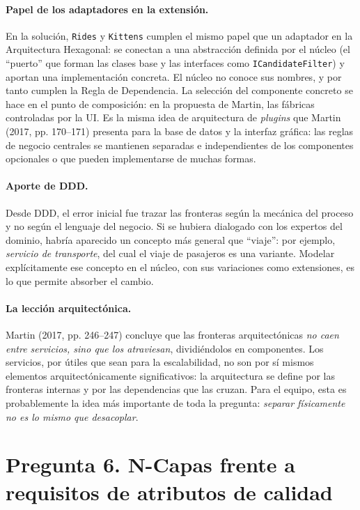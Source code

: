 \documentclass[11pt,a4paper]{article}
\begin{document}
\paragraph{Papel de los adaptadores en la extensión.} En la solución, \texttt{Rides} y \texttt{Kittens} cumplen el mismo papel que un adaptador en la Arquitectura Hexagonal: se conectan a una abstracción definida por el núcleo (el ``puerto'' que forman las clases base y las interfaces como \texttt{ICandidateFilter}) y aportan una implementación concreta. El núcleo no conoce sus nombres, y por tanto cumplen la Regla de Dependencia. La selección del componente concreto se hace en el punto de composición: en la propuesta de Martin, las fábricas controladas por la UI. Es la misma idea de arquitectura de \emph{plugins} que Martin (2017, pp. 170--171) presenta para la base de datos y la interfaz gráfica: las reglas de negocio centrales se mantienen separadas e independientes de los componentes opcionales o que pueden implementarse de muchas formas.

\paragraph{Aporte de DDD.} Desde DDD, el error inicial fue trazar las fronteras según la mecánica del proceso y no según el lenguaje del negocio. Si se hubiera dialogado con los expertos del dominio, habría aparecido un concepto más general que ``viaje'': por ejemplo, \emph{servicio de transporte}, del cual el viaje de pasajeros es una variante. Modelar explícitamente ese concepto en el núcleo, con sus variaciones como extensiones, es lo que permite absorber el cambio.

\paragraph{La lección arquitectónica.} Martin (2017, pp. 246--247) concluye que las fronteras arquitectónicas \emph{no caen entre servicios, sino que los atraviesan}, dividiéndolos en componentes. Los servicios, por útiles que sean para la escalabilidad, no son por sí mismos elementos arquitectónicamente significativos: la arquitectura se define por las fronteras internas y por las dependencias que las cruzan. Para el equipo, esta es probablemente la idea más importante de toda la pregunta: \emph{separar físicamente no es lo mismo que desacoplar}.

\section{Pregunta 6. N-Capas frente a requisitos de atributos de calidad}
\end{document}
